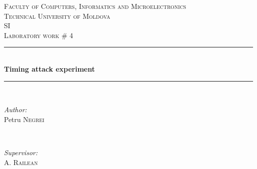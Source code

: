 \documentclass{article}
\begin{document}
  \begin{titlepage}

 \newcommand{\HRule}{\rule{\linewidth}{0.5mm}} %
  \begin{center} %

  \textsc{\Large Faculty of Computers, Informatics and Microelectronics}\\[0.5cm]
  \textsc{\LARGE Technical University of Moldova}\\[1.2cm] %
  \vspace{25 mm}
  \textsc{\Large SI}\\[0.5cm] %
  \textsc{\large Laboratory work \# 4}\\[0.5cm] %

  \vspace{10 mm}
  \HRule \\[0.4cm]
  { \LARGE \bfseries Timing attack experiment }\\[0.4cm] %
  \HRule \\[1.5cm]

  \vspace{40mm}

  \begin{minipage}{0.4\textwidth}
  \begin{flushleft} \large
  \emph{Author:}\\
  Petru \textsc{Negrei} %
  \end{flushleft}
  \end{minipage}
  ~
  \begin{minipage}{0.4\textwidth}
  \begin{flushright} \large
  \emph{Supervisor:} \\
  A. \textsc{Railean} %
  \end{flushright}
  \end{minipage}\\[4cm]


\end{center}
\end{titlepage}
\end{document}

